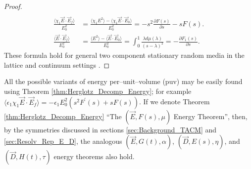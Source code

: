 \documentclass[english,12pt]{ttuthes}
\begin{document}
\begin{proof}
\begin{align*}
\end{align*}
%
\begin{align*}
  \frac{\langle\chi_1\vec{E}\cdot\vec{E}_f\rangle}{E_0^2}&=\frac{\langle\chi_1E^2\rangle-\langle\chi_1\vec{E}\cdot\vec{E}_0\rangle}{E_0^2}        
        =-s^2\frac{\partial F(s)}{\partial s}-sF(s).\\
  \frac{\langle\vec{E}\cdot\vec{E}_f\rangle}{E_0^2}&=\frac{\langle E^2\rangle-\langle\vec{E}\cdot\vec{E}_0\rangle}{E_0^2}
     =\int_0^1\frac{\lambda d\mu(\lambda)}{(s-\lambda)^2}=-\frac{\partial F_1(s)}{\partial s}.
\end{align*}
%
These formula hold for general two component stationary random media in
the lattice and continuum settings \cite{Golden:PRL-3935}.
\end{proof}
%
All the possible variants of energy per--unit--volume (puv) may be
easily found using Theorem \ref{thm:Herglotz_Decomp_Energy}; for
example $\langle\epsilon_1\chi_1\vec{E}\cdot\vec{E}_f\rangle=-\epsilon_1E_0^2(s^2F^\prime(s)+sF(s))$. If we
denote Theorem \ref{thm:Herglotz_Decomp_Energy} ``The 
$(\vec{E},F(s),\mu)$ Energy Theorem'', then, by the symmetries discussed in
sections \ref{sec:Background_TACM} and \ref{sec:Resolv_Rep_E_D}, the analogous
$(\vec{E},G(t),\alpha)$, $(\vec{D},E(s),\eta)$, and $(\vec{D},H(t),\tau)$ energy
theorems also hold.
%
\end{document}
